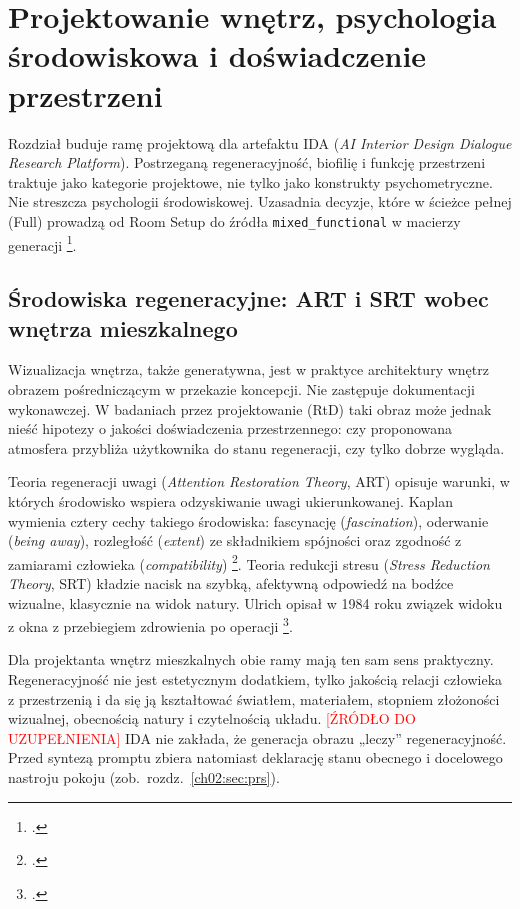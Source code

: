 \chapter{Projektowanie wnętrz, psychologia środowiskowa i doświadczenie przestrzeni}
\label{ch02:top}

Rozdział buduje ramę projektową dla artefaktu IDA (\emph{AI Interior Design Dialogue Research Platform}). Postrzeganą regeneracyjność, biofilię i funkcję przestrzeni traktuje jako kategorie projektowe, nie tylko jako konstrukty psychometryczne.
Nie streszcza psychologii środowiskowej. Uzasadnia decyzje, które w ścieżce pełnej (Full) prowadzą od Room Setup do źródła \texttt{mixed\_functional} w macierzy generacji \footcite{idaPlatform2026}.

\section{Środowiska regeneracyjne: ART i SRT wobec wnętrza mieszkalnego}
\label{ch02:sec:art}

Wizualizacja wnętrza, także generatywna, jest w praktyce architektury wnętrz obrazem pośredniczącym w przekazie koncepcji. Nie zastępuje dokumentacji wykonawczej.
W badaniach przez projektowanie (RtD) taki obraz może jednak nieść hipotezy o jakości doświadczenia przestrzennego: czy proponowana atmosfera przybliża użytkownika do stanu regeneracji, czy tylko dobrze wygląda.

Teoria regeneracji uwagi (\emph{Attention Restoration Theory}, ART) opisuje warunki, w których środowisko wspiera odzyskiwanie uwagi ukierunkowanej. Kaplan wymienia cztery cechy takiego środowiska: fascynację (\emph{fascination}), oderwanie (\emph{being away}), rozległość (\emph{extent}) ze składnikiem spójności oraz zgodność z zamiarami człowieka (\emph{compatibility}) \footcite{kaplan1995restorative}.
Teoria redukcji stresu (\emph{Stress Reduction Theory}, SRT) kładzie nacisk na szybką, afektywną odpowiedź na bodźce wizualne, klasycznie na widok natury. Ulrich opisał w 1984 roku związek widoku z okna z przebiegiem zdrowienia po operacji \footcite{ulrich1984window}.

Dla projektanta wnętrz mieszkalnych obie ramy mają ten sam sens praktyczny. Regeneracyjność nie jest estetycznym dodatkiem, tylko jakością relacji człowieka z przestrzenią i da się ją kształtować światłem, materiałem, stopniem złożoności wizualnej, obecnością natury i czytelnością układu. \textcolor{red}{[ŹRÓDŁO DO UZUPEŁNIENIA]}
IDA nie zakłada, że generacja obrazu „leczy” regeneracyjność. Przed syntezą promptu zbiera natomiast deklarację stanu obecnego i docelowego nastroju pokoju (zob.\ rozdz.~\ref{ch02:sec:prs}).

